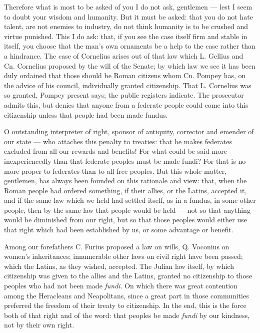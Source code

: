  Therefore what is most to be asked of you I do not ask, gentlemen --- lest I seem to doubt your wisdom and humanity. But it must be asked: that you do not hate talent, are not enemies to industry, do not think humanity is to be crushed and virtue punished. This I do ask: that, if you see the case itself firm and stable in itself, you choose that the man's own ornaments be a help to the case rather than a hindrance. The case of Cornelius arises out of that law which L. Gellius and Cn. Cornelius proposed by the will of the Senate; by which law we see it has been duly ordained that those should be Roman citizens whom Cn. Pompey has, on the advice of his council, individually granted citizenship. That L. Cornelius was so granted, Pompey present says; the public registers indicate. The prosecutor admits this, but denies that anyone from a federate people could come into this citizenship unless that people had been made fundus.

 O outstanding interpreter of right, sponsor of antiquity, corrector and emender of our state --- who attaches this penalty to treaties: that he makes federates excluded from all our rewards and benefits! For what could be said more inexperiencedly than that federate peoples must be made fundi? For that is no more proper to federates than to all free peoples. But this whole matter, gentlemen, has always been founded on this rationale and view: that, when the Roman people had ordered something, if their allies, or the Latins, accepted it, and if the same law which we held had settled itself, as in a fundus, in some other people, then by the same law that people would be held --- not so that anything would be diminished from our right, but so that those peoples would either use that right which had been established by us, or some advantage or benefit.

 Among our forefathers C. Furius proposed a law on wills, Q. Voconius on women's inheritances; innumerable other laws on civil right have been passed; which the Latins, as they wished, accepted. The Julian law itself, by which citizenship was given to the allies and the Latins, granted no citizenship to those peoples who had not been made \textit{fundi}. On which there was great contention among the Heracleans and Neapolitans, since a great part in those communities preferred the freedom of their treaty to citizenship. In the end, this is the force both of that right and of the word: that peoples be made \textit{fundi} by our kindness, not by their own right.


